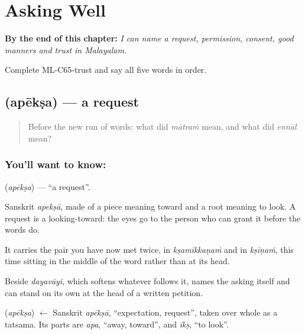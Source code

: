 
\chapter{Asking Well}
\label{ch:ml-asking-well}

\begin{chapteropening}
\textbf{By the end of this chapter:} \emph{I can name a request, permission, consent, good manners and trust in Malayalam.}

Complete ML-C65-trust and say all five words in order.
\end{chapteropening}

\section[\texorpdfstring{\ml{അപേക്ഷ} (apēkṣa)}{അപേക്ഷ (apēkṣa)}]{ (apēkṣa) — a request}

\label{lesson:ML-C65-request}



\begin{quote}
Before the new run of words: what did \emph{mātraṁ} mean, and what did \emph{ennāl} mean?
\end{quote}

\subsection*{You'll want to know: }
\textbf{} (\emph{apēkṣa}) — \textquotedblleft{}a request\textquotedblright{}.

Sanskrit \emph{apekṣā}, made of a piece meaning toward and a root meaning to look. A request is a looking-toward: the eyes go to the person who can grant it before the words do.

It carries the  pair you have now met twice, in \emph{kṣamikkaṇaṁ} and in \emph{kṣīṇaṁ}, this time sitting in the middle of the word rather than at its head.

Beside \emph{dayavāyi}, which softens whatever follows it,  names the asking itself and can stand on its own at the head of a written petition.

\begin{cousinweb}
\textbf{} (\emph{apēkṣa}) $\leftarrow$ Sanskrit \emph{apēkṣā}, \textquotedblleft{}expectation, request\textquotedblright{}, taken over whole as a tatsama. Its parts are \emph{apa}, \textquotedblleft{}away, toward\textquotedblright{}, and \emph{īkṣ}, \textquotedblleft{}to look\textquotedblright{}.
\end{cousinweb}

